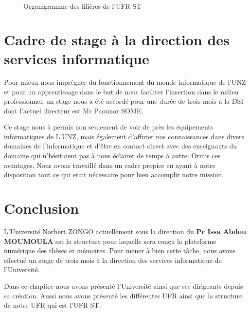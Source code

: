 \begin{figure}[H]%
    \center%
    \setlength{\fboxsep}{5pt}%
    \setlength{\fboxrule}{0.5pt}%
    \caption{Organigramme des filières de l'UFR ST}%
\end{figure}


\section{Cadre de stage à la direction des services informatique}
Pour mieux nous imprégner du fonctionnement du monde informatique de l’UNZ et pour un apprentissage dans le but de nous faciliter l’insertion dans le milieu professionnel, un stage nous a été accordé pour une durée de trois mois à la DSI dont l’actuel directeur est Mr Paounor SOME. \par

Ce stage nous à permis non seulement de voir de près les équipements informatiques de L’UNZ, mais également d’affuter nos connaissances dans divers domaines de l’informatique et d’\^etre en contact direct avec des enseignants du domaine qui n’hésitaient pas à nous éclairer de temps à autre. 
Ormis ces avantages, Nous avons travaillé dans un cadre propice en ayant à notre disposition tout ce qui etait nécessaire pour bien accomplir notre mission.

\section*{Conclusion}
L'Université Norbert ZONGO actuellement sous la direction du \textbf{Pr Issa Abdou MOUMOULA} est la structure pour laquelle sera conçu la plateforme numérique des thèses et mémoires. 
Pour mener à bien cette tâche, nous avons effectué un stage de trois mois à la direction des services informatique de l'Université.\par 
Dans ce chapitre nous avons présenté l'Université ainsi que ses dirigeants depuis sa création. Aussi nous avons présenté les différentes UFR ainsi que la structure de notre UFR qui est l'UFR-ST.  